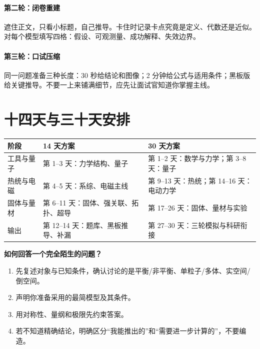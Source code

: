 \paragraph{第二轮：闭卷重建}
遮住正文，只看小标题，自己推导。卡住时记录卡点究竟是定义、代数还是近似。对每个模型填写四格：假设、可观测量、成功解释、失效边界。

\paragraph{第三轮：口试压缩}
同一问题准备三种长度：30 秒给结论和图像；2 分钟给公式与适用条件；黑板版给关键推导。不要一上来铺满细节，应先让面试官知道你掌握主线。

\section{十四天与三十天安排}
\begin{longtable}{p{}p{}p{}}
\toprule
阶段&14 天方案&30 天方案\\\midrule
工具与量子&第 1--3 天：力学结构、量子&第 1--2 天：数学与力学；第 3--8 天：量子\\
热统与电磁&第 4--5 天：系综、电磁主线&第 9--13 天：热统；第 14--16 天：电动力学\\
固体与量材&第 6--11 天：固体、强关联、拓扑、超导&第 17--26 天：固体、量材与实验\\
输出&第 12--14 天：题库、黑板推导、补漏&第 27--30 天：三轮模拟与科研衔接\\\bottomrule
\end{longtable}

\begin{interviewbox}
\textbf{如何回答一个完全陌生的问题？}
\begin{enumerate}
\item 先复述对象与已知条件，确认讨论的是平衡/非平衡、单粒子/多体、实空间/倒空间。
\item 声明你准备采用的最简模型及其条件。
\item 用对称性、量纲和极限先约束答案。
\item 若不知道精确结论，明确区分“我能推出的”和“需要进一步计算的”，不要编造。
\end{enumerate}
\end{interviewbox}
